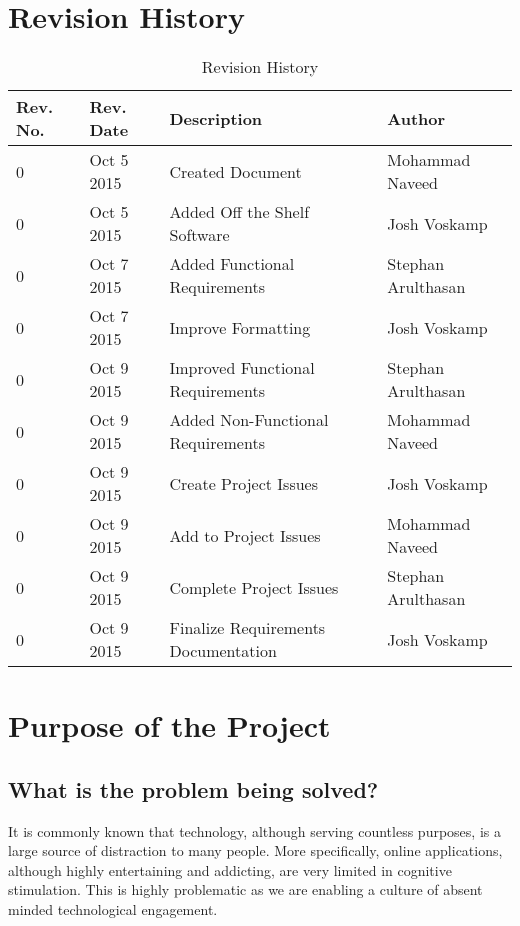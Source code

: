 \newpage
\tableofcontents
\newpage
\listoftables
{}
\newpage
\listoffigures
{}
\newpage

\section*{Revision History}
\begin{table}[!htbp]
	\centering
	\begin{tabular}{ | p{2cm} | p{2cm}| p{6cm} | p{4cm}|}
		\hline
		Rev. No. & Rev. Date & Description & Author \\\hline
		0 & Oct 5 2015 & Created Document & Mohammad Naveed \\\hline
		0 & Oct 5 2015 & Added Off the Shelf Software & Josh Voskamp \\\hline
		0 & Oct 7 2015 & Added Functional Requirements & Stephan Arulthasan\\\hline
		0 & Oct 7 2015 & Improve Formatting & Josh Voskamp \\\hline
		0 & Oct 9 2015 & Improved Functional Requirements & Stephan Arulthasan \\\hline
		0 & Oct 9 2015 & Added Non-Functional Requirements & Mohammad Naveed \\\hline
		0 & Oct 9 2015 & Create Project Issues & Josh Voskamp \\\hline
		0 & Oct 9 2015 & Add to Project Issues & Mohammad Naveed \\\hline
		0 & Oct 9 2015 & Complete Project Issues & Stephan Arulthasan \\\hline
		0 & Oct 9 2015 & Finalize Requirements Documentation & Josh Voskamp \\\hline
		
	\end{tabular}
	\caption{Revision History}
\end{table}
\newpage

\section{Purpose of the Project}
\subsection{What is the problem being solved?} 
\par\indent\indent It is commonly known that technology, although serving countless purposes, is a large source of distraction to many people. More specifically, online applications, although highly entertaining and addicting, 
are very limited in cognitive stimulation. This is highly problematic as we are enabling a culture of absent minded technological engagement.
